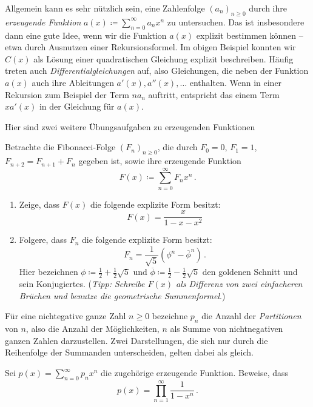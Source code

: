 Allgemein kann es sehr nützlich sein, eine Zahlenfolge $(a_n)_{n\geqslant 0}$ durch ihre \emph{erzeugende Funktion} $a(x)\coloneqq \sum_{n=0}^\infty a_nx^n$ zu untersuchen. Das ist insbesondere dann eine gute Idee, wenn wir die Funktion $a(x)$ explizit bestimmen können -- etwa durch Ausnutzen einer Rekursionsformel. Im obigen Beispiel konnten wir $C(x)$ als Lösung einer quadratischen Gleichung explizit beschreiben. Häufig treten auch \emph{Differentialgleichungen} auf, also Gleichungen, die neben der Funktion $a(x)$ auch ihre Ableitungen $a'(x),a''(x),\dotsc$ enthalten. Wenn in einer Rekursion zum Beispiel der Term $na_n$ auftritt, entspricht das einem Term $xa'(x)$ in der Gleichung für $a(x)$.

Hier sind zwei weitere Übungsaufgaben zu erzeugenden Funktionen
\begin{aufgabe*}
	Betrachte die Fibonacci-Folge $(F_n)_{n\geqslant 0}$, die durch $F_0=0$, $F_1=1$, $F_{n+2}=F_{n+1}+F_n$ gegeben ist, sowie ihre erzeugende Funktion
	\begin{equation*}
		F(x)\coloneqq\sum_{n=0}^\infty F_nx^n\,.
	\end{equation*}
	\begin{enumerate}[label={$(\alph*)$},ref={$(\alph*)$}]
		\item Zeige, dass $F(x)$ die folgende explizite Form besitzt:
		\begin{equation*}
			F(x)=\frac{x}{1-x-x^2}
		\end{equation*}
		\item Folgere, dass $F_n$ die folgende explizite Form besitzt:
		\begin{equation*}
			F_n=\frac{1}{\sqrt{5}}\left(\phi^n-\overline{\phi}^n\right)\,.
		\end{equation*}
		Hier bezeichnen $\phi\coloneqq \frac12+\frac12\sqrt{5}$ und $\overline{\phi}\coloneqq \frac12-\frac12\sqrt{5}$ den goldenen Schnitt und sein Konjugiertes. (\emph{Tipp: Schreibe $F(x)$ als Differenz von zwei einfacheren Brüchen und benutze die geometrische Summenformel}.)
	\end{enumerate}
\end{aufgabe*}
\begin{aufgabe*}
	Für eine nichtegative ganze Zahl $n\geqslant 0$ bezeichne $p_n$ die Anzahl der \emph{Partitionen} von $n$, also die Anzahl der Möglichkeiten, $n$ als Summe von nichtnegativen ganzen Zahlen darzustellen. Zwei Darstellungen, die sich nur durch die Reihenfolge der Summanden unterscheiden, gelten dabei als gleich.
	
	Sei $p(x)=\sum_{n=0}^\infty p_nx^n$ die zugehörige erzeugende Funktion. Beweise, dass
	\begin{equation*}
		p(x)=\prod_{n=1}^\infty\frac{1}{1-x^n}\,.
	\end{equation*}
\end{aufgabe*}

